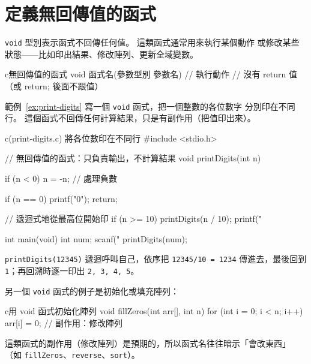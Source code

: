 \section{定義無回傳值的函式}
\label{sec:func-void}

\texttt{void} 型別表示函式不回傳任何值。 這類函式通常用來執行某個動作
或修改某些狀態——比如印出結果、修改陣列、更新全域變數。

\begin{code}{c}{無回傳值的函式}
void 函式名(參數型別 參數名) {
    // 執行動作
    // 沒有 return 值（或 return; 後面不跟值）
}
\end{code}

範例~\ref{ex:print-digits} 寫一個 \texttt{void} 函式，把一個整數的各位數字
分別印在不同行。 這個函式不回傳任何計算結果，只是有副作用（把值印出來）。

\begin{example}[label=ex:print-digits]{c}{(print-digits.c) 將各位數印在不同行}
#include <stdio.h>

// 無回傳值的函式：只負責輸出，不計算結果
void printDigits(int n) {
    if (n < 0) n = -n;  // 處理負數

    if (n == 0) {
        printf("0\n");
        return;
    }

    // 遞迴式地從最高位開始印
    if (n >= 10) {
        printDigits(n / 10);
    }
    printf("%
}

int main(void) {
    int num;
    scanf("%
    printDigits(num);
}
\end{example}


\texttt{printDigits(12345)} 遞迴呼叫自己，依序把 \texttt{12345/10 = 1234}
傳進去，最後回到 \texttt{1}；再回溯時逐一印出 \texttt{2, 3, 4, 5}。

另一個 \texttt{void} 函式的例子是初始化或填充陣列：

\begin{code}{c}{用 void 函式初始化陣列}
void fillZeros(int arr[], int n) {
    for (int i = 0; i < n; i++) {
        arr[i] = 0;  // 副作用：修改陣列
    }
}
\end{code}

這類函式的副作用（修改陣列）是預期的，所以函式名往往暗示「會改東西」
（如 \texttt{fillZeros}、\texttt{reverse}、\texttt{sort}）。

